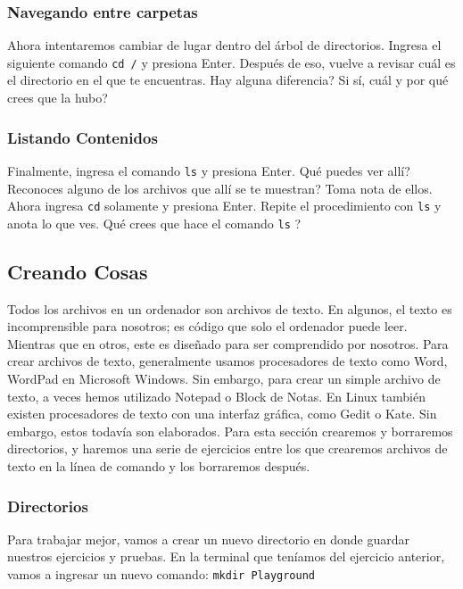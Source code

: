 \documentclass[10pt,letterpaper]{article}
\newcommand{\inlinecode}[1]{
\colorbox{light-gray}{\texttt{#1}}
}
\begin{document}
\subsubsection{Navegando entre carpetas}
Ahora intentaremos cambiar de lugar dentro del \'arbol de directorios. Ingresa el siguiente comando \inlinecode{cd /} y presiona Enter. Despu\'es de eso, vuelve a revisar cu\'al es el directorio en el que te encuentras. Hay alguna diferencia? Si s\'i, cu\'al y por qu\'e crees que la hubo?

\subsubsection{Listando Contenidos}
Finalmente, ingresa el comando \inlinecode{ls} y presiona Enter. Qu\'e puedes ver all\'i? Reconoces alguno de los archivos que all\'i se te muestran? Toma nota de ellos. Ahora ingresa \inlinecode{cd} solamente y presiona Enter. Repite el procedimiento con \inlinecode{ls} y anota lo que ves. Qu\'e crees que hace el comando \inlinecode{ls}?

\subsection{Creando Cosas}
Todos los archivos en un ordenador son archivos de texto. En algunos, el texto es incomprensible para nosotros; es c\'odigo que solo el ordenador puede leer. Mientras que en otros, este es dise\~nado para ser comprendido por nosotros. Para crear archivos de texto, generalmente usamos procesadores de texto como Word, WordPad en Microsoft Windows. Sin embargo, para crear un simple archivo de texto, a veces hemos utilizado Notepad o Block de Notas. En Linux tambi\'en existen procesadores de texto con una interfaz gr\'afica, como Gedit o Kate. Sin embargo, estos todav\'ia son elaborados. Para esta secci\'on crearemos y borraremos directorios, y haremos una serie de ejercicios entre los que crearemos archivos de texto en la l\'inea de comando y los borraremos despu\'es.

\subsubsection{Directorios}
Para trabajar mejor, vamos a crear un nuevo directorio en donde guardar nuestros ejercicios y pruebas. En la terminal que ten\'iamos del ejercicio anterior, vamos a ingresar un nuevo comando: \inlinecode{mkdir Playground}\\
\end{document}
